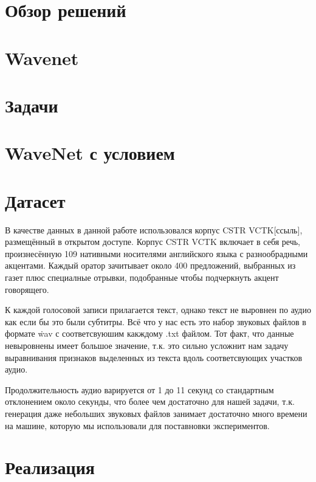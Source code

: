 \documentclass{spbau-diploma}
\begin{document}
\section{Обзор решений}


\section{Wavenet}


\section{Задачи}


\section{WaveNet с условием}


\section{Датасет}
В качестве данных в данной работе использовался корпус CSTR VCTK[ссыль], размещённый в открытом доступе. Корпус CSTR VCTK включает в себя речь, произнесённую 109 нативными носителями английского языка с разнообрадными акцентами. Каждый оратор зачитывает около 400 предложений, выбранных из газет плюс специалные отрывки, подобранные чтобы подчеркнуть акцент говорящего. 

К каждой голосовой записи прилагается текст, однако текст не выровнен по аудио как если бы это были субтитры. Всё что у нас есть это набор звуковых файлов в формате \.wav с соответсвуюшим какждому .txt файлом.
Тот факт, что данные невыровнены имеет большое значение, т.к. это сильно усложнит нам задачу выравнивания признаков выделенных из текста вдоль соответсвующих участков аудио.

Продолжительность аудио варируется от 1 до 11 секунд со стандартным отклонением около секунды, что более чем достаточно для нашей задачи, т.к. генерация даже небольших звуковых файлов занимает достаточно много времени на машине, которую мы использовали для поставновки экспериментов.


\section{Реализация}

\end{document}
